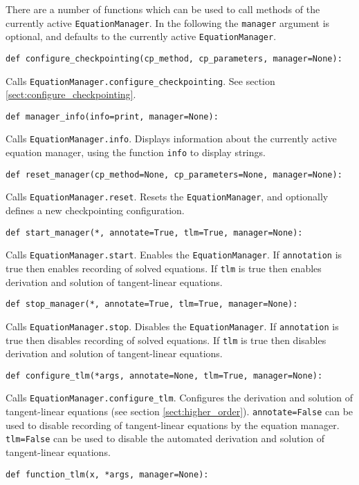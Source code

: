 \documentclass[11pt]{article}
\begin{document}
There are a number of functions which can be used to call methods of the
currently active \texttt{EquationManager}. In the following the
\texttt{manager} argument is optional, and defaults to the currently active
\texttt{EquationManager}.
\begin{lstlisting}
def configure_checkpointing(cp_method, cp_parameters, manager=None):
\end{lstlisting}
Calls \texttt{EquationManager.configure\_checkpointing}. See section
\ref{sect:configure_checkpointing}.
\begin{lstlisting}
def manager_info(info=print, manager=None):
\end{lstlisting}
Calls \texttt{EquationManager.info}. Displays information about the currently
active equation manager, using the function \texttt{info} to display strings.
\begin{lstlisting}
def reset_manager(cp_method=None, cp_parameters=None, manager=None):
\end{lstlisting}
Calls \texttt{EquationManager.reset}. Resets the \texttt{EquationManager}, and
optionally defines a new checkpointing configuration.
\begin{lstlisting}
def start_manager(*, annotate=True, tlm=True, manager=None):
\end{lstlisting}
Calls \texttt{EquationManager.start}. Enables the \texttt{EquationManager}. If
\texttt{annotation} is true then enables recording of solved equations. If
\texttt{tlm} is true then enables derivation and solution of tangent-linear
equations.
\begin{lstlisting}
def stop_manager(*, annotate=True, tlm=True, manager=None):
\end{lstlisting}
Calls \texttt{EquationManager.stop}. Disables the \texttt{EquationManager}. If
\texttt{annotation} is true then disables recording of solved equations. If
\texttt{tlm} is true then disables derivation and solution of tangent-linear
equations.
\begin{lstlisting}
def configure_tlm(*args, annotate=None, tlm=True, manager=None):
\end{lstlisting}
Calls \texttt{EquationManager.configure\_tlm}. Configures the derivation and
solution of tangent-linear equations (see section \ref{sect:higher_order}).
\texttt{annotate=False} can be used to disable recording of tangent-linear
equations by the equation manager. \texttt{tlm=False} can be used to disable
the automated derivation and solution of tangent-linear equations.
\begin{lstlisting}
def function_tlm(x, *args, manager=None):
\end{lstlisting}
\end{document}
